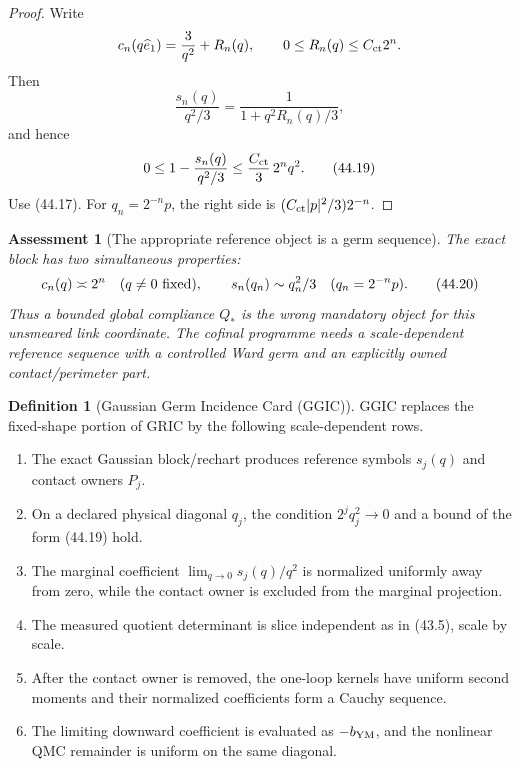 \documentclass[11pt,oneside]{book}
\newtheorem{assessment}[theorem]{Assessment}
\theoremstyle{definition}
\newtheorem{definition}[theorem]{Definition}
\theoremstyle{remark}
\begin{document}
\begin{proof}
Write
\[
 c_n(q\widehat e_1)=\frac3{q^2}+R_n(q),
 \qquad 0\le R_n(q)\le C_{\rm ct}2^n.
\]
Then
\[
 \frac{s_n(q)}{q^2/3}
 =\frac1{1+q^2R_n(q)/3},
\]
and hence
\[
 0\le1-\frac{s_n(q)}{q^2/3}
 \le\frac{C_{\rm ct}}3\,2^nq^2.                                \tag{44.19}
\]
Use (44.17).  For \(q_n=2^{-n}p\), the right side is
\((C_{\rm ct}|p|^2/3)2^{-n}\).
\end{proof}

\begin{assessment}[The appropriate reference object is a germ
sequence]
\label{ass:e8v44-germ-sequence}
The exact block has two simultaneous properties:
\[
 c_n(q)\asymp2^n\quad(q\ne0\ \hbox{fixed}),\qquad
 s_n(q_n)\sim q_n^2/3\quad(q_n=2^{-n}p).                        \tag{44.20}
\]
Thus a bounded global compliance \(Q_*\) is the wrong mandatory
object for this unsmeared link coordinate.  The cofinal programme
needs a scale-dependent reference sequence with a controlled Ward
germ and an explicitly owned contact/perimeter part.
\end{assessment}

\begin{definition}[Gaussian Germ Incidence Card (GGIC)]
\label{def:e8v44-GGIC}
GGIC replaces the fixed-shape portion of GRIC by the following
scale-dependent rows.
\begin{enumerate}
\item The exact Gaussian block/rechart produces reference symbols
      \(s_j(q)\) and contact owners \(P_j\).
\item On a declared physical diagonal \(q_j\), the condition
      \(2^jq_j^2\to0\) and a bound of the form (44.19) hold.
\item The marginal coefficient
      \(\lim_{q\to0}s_j(q)/q^2\) is normalized uniformly away from
      zero, while the contact owner is excluded from the marginal
      projection.
\item The measured quotient determinant is slice independent as in
      (43.5), scale by scale.
\item After the contact owner is removed, the one-loop kernels have
      uniform second moments and their normalized coefficients form
      a Cauchy sequence.
\item The limiting downward coefficient is evaluated as
      \(-b_{\rm YM}\), and the nonlinear QMC remainder is uniform on
      the same diagonal.
\end{enumerate}
\end{definition}
\end{document}
